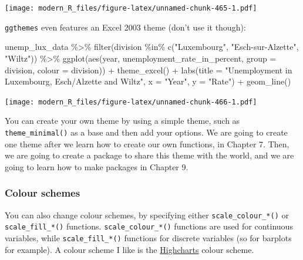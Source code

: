 \documentclass[
]{article}
\newenvironment{Shaded}{\begin{snugshade}}{\end{snugshade}}
\newcommand{\AttributeTok}[1]{\textcolor[rgb]{0.77,0.63,0.00}{#1}}
\newcommand{\FunctionTok}[1]{\textcolor[rgb]{0.00,0.00,0.00}{#1}}
\newcommand{\NormalTok}[1]{#1}
\newcommand{\SpecialCharTok}[1]{\textcolor[rgb]{0.00,0.00,0.00}{#1}}
\newcommand{\StringTok}[1]{\textcolor[rgb]{0.31,0.60,0.02}{#1}}
\begin{document}
\texttt{[image: modern\_R\_files/figure-latex/unnamed-chunk-465-1.pdf]}

\texttt{ggthemes} even features an Excel 2003 theme (don't use it though):

\begin{Shaded}
\begin{Highlighting}[]
\NormalTok{unemp\_lux\_data }\SpecialCharTok{\%\textgreater{}\%}
  \FunctionTok{filter}\NormalTok{(division }\SpecialCharTok{\%in\%} \FunctionTok{c}\NormalTok{(}\StringTok{"Luxembourg"}\NormalTok{, }\StringTok{"Esch{-}sur{-}Alzette"}\NormalTok{, }\StringTok{"Wiltz"}\NormalTok{)) }\SpecialCharTok{\%\textgreater{}\%}
  \FunctionTok{ggplot}\NormalTok{(}\FunctionTok{aes}\NormalTok{(year, unemployment\_rate\_in\_percent, }\AttributeTok{group =}\NormalTok{ division, }\AttributeTok{colour =}\NormalTok{ division)) }\SpecialCharTok{+}
  \FunctionTok{theme\_excel}\NormalTok{() }\SpecialCharTok{+}
  \FunctionTok{labs}\NormalTok{(}\AttributeTok{title =} \StringTok{"Unemployment in Luxembourg, Esch/Alzette and Wiltz"}\NormalTok{, }\AttributeTok{x =} \StringTok{"Year"}\NormalTok{, }\AttributeTok{y =} \StringTok{"Rate"}\NormalTok{) }\SpecialCharTok{+}
  \FunctionTok{geom\_line}\NormalTok{()}
\end{Highlighting}
\end{Shaded}

\texttt{[image: modern\_R\_files/figure-latex/unnamed-chunk-466-1.pdf]}

You can create your own theme by using a simple theme, such as \texttt{theme\_minimal()} as a base
and then add your options. We are going to create one theme after we learn how to create our
own functions, in Chapter 7. Then, we are going to create a package to share this theme with
the world, and we are going to learn how to make packages in Chapter 9.

\hypertarget{colour-schemes}{%
\subsubsection{Colour schemes}\label{colour-schemes}}

You can also change colour schemes, by specifying either \texttt{scale\_colour\_*()} or \texttt{scale\_fill\_*()}
functions. \texttt{scale\_colour\_*()} functions are used for continuous variables, while \texttt{scale\_fill\_*()}
functions for discrete variables (so for barplots for example). A colour scheme I like is the
\href{https://www.highcharts.com/}{Highcharts} colour scheme.
\end{document}
